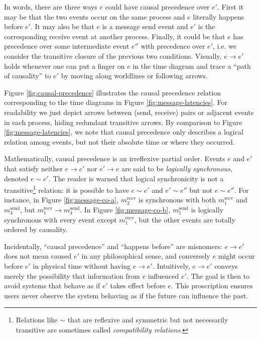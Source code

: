 \documentclass[]             %
{NASA}                       %
\theoremstyle{definition}
\begin{document}
In words, there are three ways $e$ could have causal precedence over
$e'$.  First it may be that the two events occur on the same process
and $e$ literally happens before $e'$. It may also be that $e$ is a
message send event and $e'$ is the corresponding receive event at
another process. Finally, it could be that $e$ has precedence over
some intermediate event $e''$ with precedence over $e'$, i.e. we
consider the transitive closure of the previous two
conditions. Visually, $e \to e'$ holds whenever one can put a finger
on $e$ in the time diagram and trace a ``path of causality'' to $e'$
by moving along worldlines or following arrows.

Figure \ref{fig:causal-precedence} illustrates the causal precedence
relation corresponding to the time diagrams in Figure
\ref{fig:message-latencies}. For readability we just depict arrows
between (send, receive) pairs or adjacent events in each process,
hiding redundant transitive arrows. By comparison to Figure
\ref{fig:message-latencies}, we note that causal precedence only
describes a logical relation among events, but not their absolute time
or where they occurred.

Mathematically, causal precedence is an irreflexive partial
order. Events $e$ and $e'$ that satisfy neither $e \to e'$ nor
$e' \to e$ are said to be \emph{logically synchronous}, denoted
$e \sim e'$. The reader is warned that logical synchronicity is not a
transitive\footnote{Relations like $\sim$ that are reflexive and
  symmetric but not necessarily transitive are sometimes called
  \emph{compatibility relations}.} relation: it is possible to have
$e \sim e'$ and $e' \sim e''$ but not $e \sim e''$. For instance, in
Figure \ref{fig:message-co-a}, $m_2^{\textrm{recv}}$ is synchronous
with both $m_1^{\textrm{recv}}$ and $m_4^{\textrm{send}}$, but
$m_1^{\textrm{recv}} \to m_4^{\textrm{send}}$. In Figure
\ref{fig:message-co-b}, $m_1^\textrm{send}$ is logically synchronous
with every event except $m_1^\textrm{recv}$, but the other events are
totally ordered by causality.

Incidentally, ``causal precedence'' and ``happens before'' are
misnomers: $e \to e'$ does not mean caused $e'$ in any philosophical
sense, and conversely $e$ might occur before $e'$ in physical time
without having $e \to e'$. Intuitively, $e \to e'$ conveys merely the
possibility that information from $e$ influenced $e'$. The goal is
then to avoid systems that behave as if $e'$ takes effect before
$e$. This proscription ensures users never observe the system behaving
as if the future can influence the past.
\end{document}
